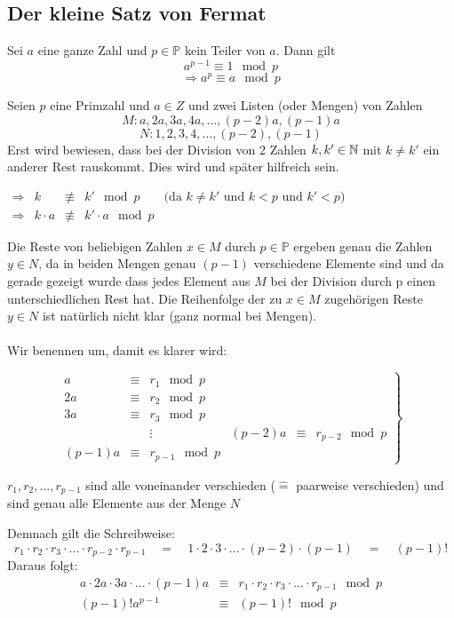 \documentclass[main.tex]{subfiles}
\begin{document}
\subsection{Der kleine Satz von Fermat}

\begin{Definition}
	Sei $a$ eine ganze Zahl und $p \in \mathbb{P}$ kein Teiler von $a$. Dann gilt
	$$a^{p-1} \equiv 1 \mod p$$
	$$\Rightarrow a^p \equiv a \mod p$$
\end{Definition}

\begin{Beweis}
	Seien $p$ eine Primzahl und $a \in Z$ und zwei Listen (oder Mengen) von Zahlen
	$$M: a, 2a, 3a, 4a, ..., (p-2)a, (p-1)a$$
	$$N: 1, 2, 3, 4, ..., (p-2), (p-1)$$
	Erst wird bewiesen, dass bei der Division von 2 Zahlen $k,k' \in \mathbb{N}$ mit $k \neq k'$ ein anderer Rest rauskommt. Dies wird und später hilfreich sein.

	$\begin{array}{rcccl}
		\Rightarrow & k & \not\equiv & k' \mod p  & \text{(da $k \neq k'$ und $k<p$ und $k'<p$)} \\
		\Rightarrow & k \cdot a & \not\equiv & k' \cdot a \mod p  &
	\end{array}$
	
	Die Reste von beliebigen Zahlen $x \in M$ durch $p \in \mathbb{P}$ ergeben genau die Zahlen $y \in N$, da in beiden Mengen genau $(p-1)$ verschiedene Elemente sind und da gerade gezeigt wurde dass jedes Element aus $M$ bei der Division durch p einen unterschiedlichen Rest hat. Die Reihenfolge der zu $x \in M$ zugehörigen Reste $y \in N$  ist natürlich nicht klar (ganz normal bei Mengen). \\\\
	Wir benennen um, damit es klarer wird:

	$$\left.\begin{array}{rcl}
		a & \equiv & r_{1} \mod p\\
		2a & \equiv & r_{2} \mod p \\
		3a & \equiv & r_{3} \mod p \\
		&& \vdots &
		(p - 2)a & \equiv & r_{p-2} \mod p \\
		(p - 1)a & \equiv & r_{p-1} \mod p
	\end{array} \right \}$$

	$r_{1}, r_{2}, ..., r_{p-1}$ sind alle voneinander verschieden ($\widehat{=}$ paarweise verschieden) und sind genau alle Elemente aus der Menge $N$
	
	Demnach gilt die Schreibweise:
	$$r_1 \cdot r_2 \cdot r_3 \cdot ... \cdot r_{p-2} \cdot r_{p-1} \quad = \quad 1 \cdot 2 \cdot 3 \cdot ... \cdot (p-2) \cdot (p-1) \quad = \quad (p-1)! $$
	Daraus folgt:
	$$\begin{array}{rcl}
		 a \cdot 2a \cdot 3a \cdot ... \cdot (p-1)a & \equiv & r_1 \cdot r_2 \cdot r_3 \cdot ... \cdot r_{p-1} \mod p \\
		(p-1)! a^{p-1} & \equiv & (p-1)! \mod p
	\end{array}$$


\end{Beweis}
\end{document}
